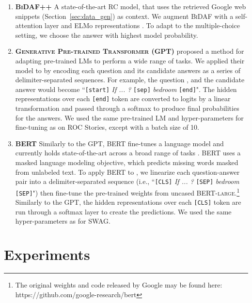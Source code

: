 \begin{enumerate}[wide, labelwidth=!,labelindent=0pt,topsep=0pt,itemsep=0pt,label=\textbf{\alph*}]
    \item \textbf{\textsc{BiDAF++}} A state-of-the-art RC model, that uses the retrieved Google web snippets (Section~\ref{sec:data_gen}) as context. We augment \textsc{BiDAF} \cite{seo2016bidaf} with a self-attention layer and ELMo representations \cite{Peters:2018,huang2018flowqa}. To adapt to the multiple-choice setting, we choose the answer with highest model probability.

    \item \textbf{\textsc{Generative Pre-trained Transformer (GPT)}}  proposed a method for adapting pre-trained LMs to perform a wide range of tasks. We applied their model to \dataset{} by encoding each question and its candidate answers as a series of delimiter-separated sequences. For example, the question , and the candidate answer  would become ``\texttt{[start]} \emph{If ... ?} \texttt{[sep]} \emph{bedroom} \texttt{[end]}". The hidden representations over each \texttt{[end]} token are converted to logits by a linear transformation and passed through a softmax to produce final probabilities for the answers. We used the same pre-trained LM and hyper-parameters for fine-tuning as  on ROC Stories, except with a batch size of 10.

    \item \textbf{\textsc{BERT}} Similarly to the \textsc{GPT}, BERT fine-tunes a language model and currently holds state-of-the-art across a broad range of tasks \cite{devlin2018BERT}. \textsc{BERT} uses a masked language modeling objective, which predicts missing words masked from unlabeled text. To apply \textsc{BERT} to \dataset{}, we linearize each question-answer pair into a delimiter-separated sequence (i.e., ``\texttt{[CLS]} \emph{If ... ?} \texttt{[SEP]} \emph{bedroom} \texttt{[SEP]}") then fine-tune the pre-trained weights from uncased \textsc{BERT-large}.\footnote{The original weights and code released by Google may be found here: https://github.com/google-research/bert} Similarly to the GPT, the hidden representations over each \texttt{[CLS]} token are run through a softmax layer to create the predictions. We used the same hyper-parameters as  for SWAG.

\end{enumerate}

\section{Experiments}

